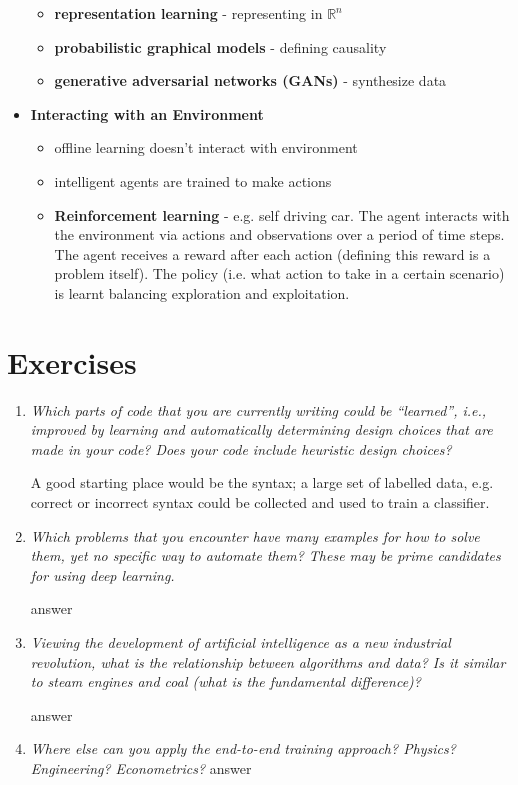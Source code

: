 \documentclass[12pt,notitlepage]{article}
\begin{document}
\begin{itemize}
\begin{itemize}
              \item \textbf{representation learning} - representing in $\mathbb{R}^n$
              \item \textbf{probabilistic graphical models} - defining causality
              \item \textbf{generative adversarial networks (GANs)} - synthesize data
          \end{itemize}
    \item \textbf{Interacting with an Environment}
          \begin{itemize}
              \item offline learning doesn't interact with environment
              \item intelligent agents are trained to make actions
              \item \textbf{Reinforcement learning} - e.g. self driving car. The agent interacts
                    with the environment via actions and observations over a period of time steps. The
                    agent receives a reward after each action (defining this reward is a problem
                    itself). The policy (i.e. what action to take in a certain scenario) is learnt
                    balancing exploration and exploitation.
          \end{itemize}
\end{itemize}

\section{Exercises}
\begin{enumerate}
    \item \textit{Which parts of code that you are currently writing could be “learned”, i.e.,
              improved by learning and automatically determining design choices that are made in your code? Does your code include heuristic design choices?}

          A good starting place would be the syntax; a large set of labelled data, e.g. correct or incorrect syntax could be collected
          and used to train a classifier.
    \item \textit{Which problems that you encounter have many examples for how to solve them, yet no specific way to automate them? These may be prime candidates for using deep learning.}

          answer
    \item \textit{Viewing the development of artificial intelligence as a new industrial revolution, what is the relationship between algorithms and data? Is it similar to steam engines and coal (what is the fundamental difference)?}

          answer
    \item \textit{Where else can you apply the end-to-end training approach? Physics? Engineering? Econometrics?}
          answer
\end{enumerate}


\vfill

\nocite{LeCun2015}
\nocite{zhang2020dive}
\end{document}
